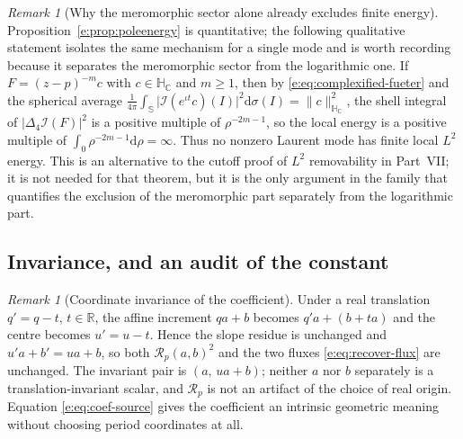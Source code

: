 \documentclass[11pt,a4paper]{article}
\numberwithin{equation}{section}
\theoremstyle{definition}
\theoremstyle{remark}
\newtheorem{remark}[theorem]{Remark}
\theoremstyle{plain}
\newcommand{\HC}{\mathbb H_{\mathbb C}}
\newcommand{\RR}{\mathbb R}
\newcommand{\SSS}{\mathbb S}
\newcommand{\lap}{\Delta_4}
\newcommand{\I}{\mathcal I}
\newcommand{\Rp}{\mathcal R_{p}}      %
\newcommand{\abs}[1]{\lvert #1\rvert}
\newcommand{\norm}[1]{\lVert #1\rVert}
\newcommand{\dd}{\mathrm d}
\begin{document}
\begin{remark}[Why the meromorphic sector alone already excludes finite
energy]
\label{e:rem:poleenergy2}
Proposition~\ref{e:prop:poleenergy} is quantitative; the following
qualitative statement isolates the same mechanism for a single mode and
is worth recording because it separates the meromorphic sector from the
logarithmic one. If $F=(z-p)^{-m}c$ with $c\in\HC$ and $m\ge1$, then by
\eqref{e:eq:complexified-fueter} and the spherical average
$\frac1{4\pi}\int_{\SSS}\bigl|\I(e^{\iota t}c)(I)\bigr|^2\dd\sigma(I)
=\norm c_{\HC}^2$, the shell integral of $\abs{\lap\I(F)}^2$ is a
positive multiple of $\rho^{-2m-1}$, so the local energy is a positive
multiple of $\int_0\rho^{-2m-1}\dd\rho=\infty$. Thus no nonzero Laurent
mode has finite local $L^2$ energy. This is an alternative to the cutoff
proof of $L^2$ removability in Part~VII; it is not needed for that
theorem, but it is the only argument in the family that quantifies the
exclusion of the meromorphic part separately from the logarithmic part.
\end{remark}

\subsection{Invariance, and an audit of the constant}
\label{e:sec:audit}

\begin{remark}[Coordinate invariance of the coefficient]
\label{e:rem:translation}
Under a real translation $q'=q-t$, $t\in\RR$, the affine increment
$qa+b$ becomes $q'a+(b+ta)$ and the centre becomes $u'=u-t$. Hence the
slope residue is unchanged and $u'a+b'=ua+b$, so both
$\Rp(a,b)^2$ and the two fluxes \eqref{e:eq:recover-flux} are unchanged.
The invariant pair is $(a,\,ua+b)$; neither $a$ nor $b$ separately is a
translation-invariant scalar, and $\Rp$ is not an artifact of the choice
of real origin. Equation \eqref{e:eq:coef-source} gives the coefficient
an intrinsic geometric meaning without choosing period coordinates at
all.
\end{remark}
\end{document}
